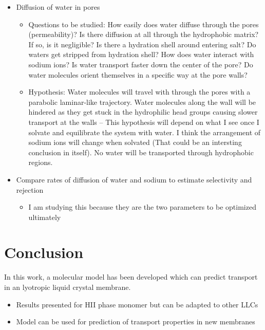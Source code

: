 \documentclass{article}
\begin{document}
\begin{itemize}
\begin{itemize}
	\end{itemize}
	\item Diffusion of water in pores
	\begin{itemize}
		\item Questions to be studied: How easily does water diffuse through the pores (permeability)? Is there diffusion at all through the hydrophobic matrix? If so, is it negligible? Is there a hydration shell around entering salt? Do waters get stripped from hydration shell? How does water interact with sodium ions? Is water transport faster down the center of the pore? Do water molecules orient themselves in a specific way at the pore walls?
		\item Hypothesis: Water molecules will travel with through the pores with a parabolic laminar-like trajectory. Water molecules along the wall will be hindered as they get stuck in the hydrophilic head groups causing slower transport at the walls -- This hypothesis will depend on what I see once I solvate and equilibrate the system with water. I think the arrangement of sodium ions will change when solvated (That could be an intersting conclusion in itself). No water will be transported through hydrophobic regions.    
	\end{itemize}
	\item Compare rates of diffusion of water and sodium to estimate selectivity and rejection
	\begin{itemize}
		\item I am studying this because they are the two parameters to be optimized ultimately
	\end{itemize}
\end{itemize}

\section{Conclusion}

In this work, a molecular model has been developed which can predict transport in an lyotropic liquid crystal membrane. 
\begin{itemize}
	\item Results presented for HII phase monomer but can be adapted to other LLCs
	\item Model can be used for prediction of transport properties in new membranes
\end{itemize}
\end{document}
